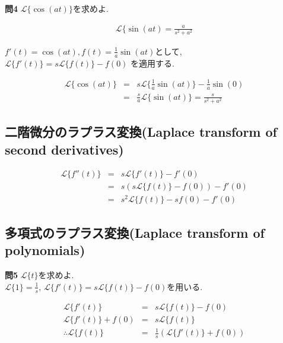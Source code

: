 ﻿\documentclass[a4j]{jarticle}
\begin{document}
\noindent
\large{\bf{問4}}\/ \( \mathcal{L} \{ \cos(at) \} \)を求めよ.

\begin{eqnarray*}
\mathcal{L} \{ \sin(at) = \frac{a}{s^2+a^2}
\end{eqnarray*}

\( f'(t) = \cos(at), f(t) = \frac{1}{a}\sin(at) \)として, \( \mathcal{L} \{ f'(t) \} = s \mathcal{L} \{ f(t) \} - f(0) \) を適用する.

\begin{eqnarray*}
\mathcal{L} \{ \cos(at) \} &=& s \mathcal{L} \{ \frac{1}{a}\sin(at) \} - \frac{1}{a}\sin(0) \\
                           &=& \frac{s}{a} \mathcal{L} \{ \sin(at) \} = \frac{s}{s^2+a^2}
\end{eqnarray*}

\subsection{二階微分のラプラス変換(Laplace transform of second derivatives)}

\begin{eqnarray*}
\mathcal{L} \{  f''(t) \} &=& s \mathcal{L} \{  f'(t) \} - f'(0) \\
                          &=& s \left( s \mathcal{L} \{  f(t) \} - f(0) \right) - f'(0) \\
                          &=& s^2 \mathcal{L} \{  f(t) \} - s f(0) - f'(0)
\end{eqnarray*}

\subsection{多項式のラプラス変換(Laplace transform of polynomials)}

\noindent
\large{\bf{問5}}\/ \( \mathcal{L} \{ t \} \)を求めよ. \\

\( \mathcal{L} \{ 1 \} = \frac{1}{s} ,\, \mathcal{L} \{ f'(t) \} = s \mathcal{L} \{ f(t) \} - f(0) \)を用いる.

\begin{eqnarray*}
            \mathcal{L} \{ f'(t) \} &=& s \mathcal{L} \{ f(t) \} - f(0) \\
     \mathcal{L} \{ f'(t) \} + f(0) &=& s \mathcal{L} \{ f(t) \} \\
\therefore \mathcal{L} \{ f(t) \} &=& \frac{1}{s} \left( \mathcal{L} \{ f'(t) \} + f(0) \right)
\end{eqnarray*}
\end{document}
